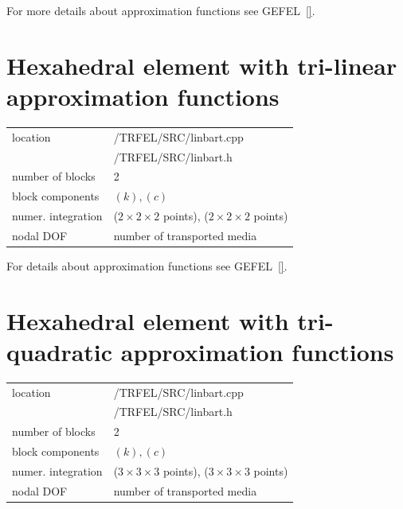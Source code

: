 For more details about approximation functions see GEFEL~\ref{}.

\section{Hexahedral element with tri-linear approximation functions}
\label{linhext}

\begin{center}
\begin{tabular}{|l|l|}
\hline
location & /TRFEL/SRC/linbart.cpp\\
         & /TRFEL/SRC/linbart.h
\\ \hline
number of blocks & 2
\\ \hline
block components & $(k), (c)$
\\ \hline
numer. integration & ($2 \times 2 \times 2$ points), ($2 \times 2 \times 2$ points)
\\ \hline
nodal DOF & number of transported media
\\ \hline
\end{tabular}
\end{center}

For details about approximation functions see GEFEL~\ref{}.

\section{Hexahedral element with tri-quadratic approximation functions}
\label{hexquadt}

\begin{center}
\begin{tabular}{|l|l|}
\hline
location & /TRFEL/SRC/linbart.cpp\\
         & /TRFEL/SRC/linbart.h
\\ \hline
number of blocks & 2
\\ \hline
block components & $(k), (c)$
\\ \hline
numer. integration & ($3 \times 3 \times 3$ points), ($3 \times 3 \times 3$ points)
\\ \hline
nodal DOF & number of transported media
\\ \hline
\end{tabular}
\end{center}

